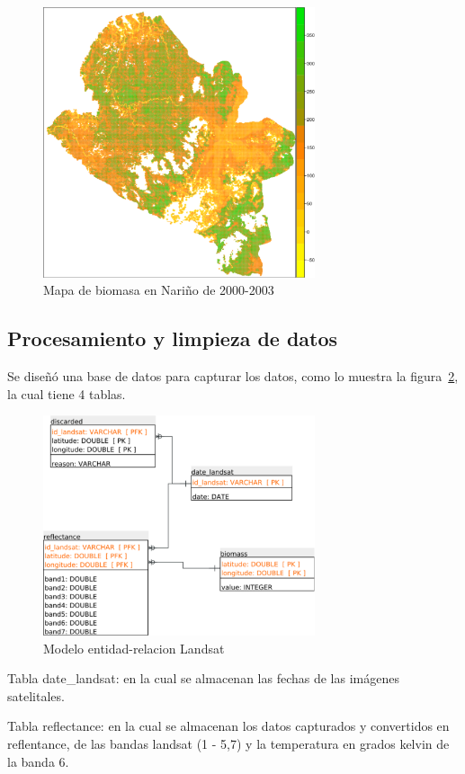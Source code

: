 \begin{figure}
  \centering
  \includegraphics[width = 8cm]{mapaNarino.pdf}
  \caption{Mapa de biomasa en Nariño de 2000-2003 \cite{baccini2008afirst}}
  \label{fig:mapaNarino}
\end{figure}

\subsection{Procesamiento y limpieza de datos}

Se diseñó una base de datos para capturar los datos,
como lo muestra la figura~\ref{fig:landsatET}, la cual tiene 4 tablas. 

\begin{figure}
  \centering
  \includegraphics[width = 8cm]{landsatET.pdf}
  \caption{Modelo entidad-relacion Landsat}
  \label{fig:landsatET}
\end{figure}

Tabla date\_landsat: en la cual se almacenan las fechas de las imágenes satelitales.

Tabla reflectance: en la cual se almacenan los datos capturados y convertidos en reflentance,
de las bandas landsat (1 - 5,7) y la temperatura en grados kelvin de la banda 6.

